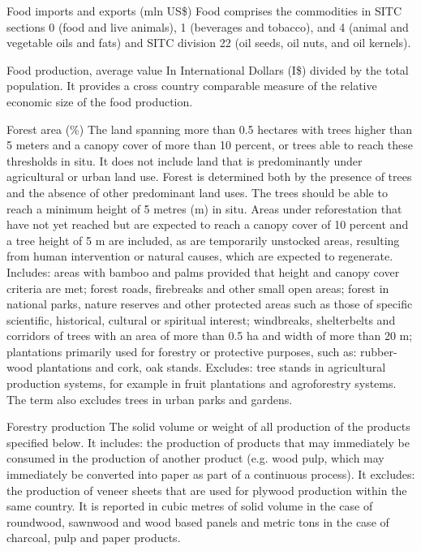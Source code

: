 \begin{MetadataCollection} {}
\begin{metadata}{Food imports and exports (mln US\$)} {}
Food comprises the commodities in SITC sections 0 (food and live animals), 1 (beverages and tobacco), and 4 (animal and vegetable oils and fats) and SITC division 22 (oil seeds, oil nuts, and oil kernels).
\end{metadata}

\begin{metadata}{Food production, average value} {}
 In International Dollars (I\$) divided by the total population. It provides a cross country comparable measure of the relative economic size of the food production.
\end{metadata}


\begin{metadata}{Forest area (\%)} {}
The land spanning more than 0.5 hectares with trees higher than 5 meters and a canopy cover of more than 10 percent, or trees able to reach these thresholds in situ. It does not include land that is predominantly under agricultural or urban land use. Forest is determined both by the presence of trees and the absence of other predominant land uses. The trees should be able to reach a minimum height of 5 metres (m) in situ. Areas under reforestation that have not yet reached but are expected to reach a canopy cover of 10 percent and a tree height of 5 m are included, as are temporarily unstocked areas, resulting from human intervention or natural causes, which are expected to regenerate. Includes: areas with bamboo and palms provided that height and canopy cover criteria are met; forest roads, firebreaks and other small open areas; forest in national parks, nature reserves and other protected areas such as those of specific scientific, historical, cultural or spiritual interest; windbreaks, shelterbelts and corridors of trees with an area of more than 0.5 ha and width of more than 20 m; plantations primarily used for forestry or protective purposes, such as: rubber-wood plantations and cork, oak stands. Excludes: tree stands in agricultural production systems, for example in fruit plantations and agroforestry systems. The term also excludes trees in urban parks and gardens.
\end{metadata}

\begin{metadata}{Forestry production} {}
The solid volume or weight of all production of the products specified below. It includes: the production of products that may immediately be consumed in the production of another product (e.g. wood pulp, which may immediately be converted into paper as part of a continuous process). It excludes: the production of veneer sheets that are used for plywood production within the same country. It is reported in cubic metres of solid volume in the case of roundwood, sawnwood and wood based panels and metric tons in the case of charcoal, pulp and paper products.
\end{metadata}



\end{MetadataCollection}
